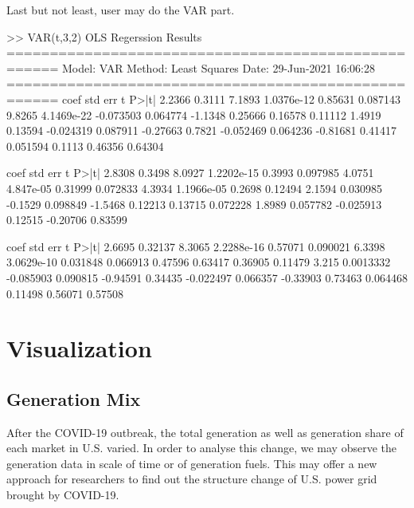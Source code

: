 \documentclass[10pt]{article}
\numberwithin{equation}{section}
\numberwithin{table}{section}
\numberwithin{figure}{section}
\begin{document}
Last but not least, user may do the VAR part. 
\begin{Command}
>> VAR(t,3,2)
               OLS Regerssion Results 
====================================================
           Model:                      VAR
           Method:           Least Squares
           Date:      29-Jun-2021 16:06:28
====================================================
        coef        std err         t         P>|t|     
       2.2366       0.3111       7.1893   1.0376e-12
      0.85631     0.087143       9.8265   4.1469e-22
    -0.073503     0.064774      -1.1348      0.25666
      0.16578      0.11112       1.4919      0.13594
    -0.024319     0.087911     -0.27663       0.7821
    -0.052469     0.064236     -0.81681      0.41417
     0.051594       0.1113      0.46356      0.64304

        coef        std err         t         P>|t|     
       2.8308       0.3498       8.0927   1.2202e-15
       0.3993     0.097985       4.0751    4.847e-05
      0.31999     0.072833       4.3934   1.1966e-05
       0.2698      0.12494       2.1594     0.030985
      -0.1529     0.098849      -1.5468      0.12213
      0.13715     0.072228       1.8989     0.057782
    -0.025913      0.12515     -0.20706      0.83599


        coef        std err         t         P>|t|     
       2.6695      0.32137       8.3065   2.2288e-16
      0.57071     0.090021       6.3398   3.0629e-10
     0.031848     0.066913      0.47596      0.63417
      0.36905      0.11479        3.215    0.0013332
    -0.085903     0.090815     -0.94591      0.34435
    -0.022497     0.066357     -0.33903      0.73463
     0.064468      0.11498      0.56071      0.57508
\end{Command}


\newpage
\section{Visualization} \label{sec:visual}

\subsection{Generation Mix}

After the COVID-19 outbreak, the total generation as well as generation share of each market in U.S. varied. In order to analyse this change, we may observe the generation data in scale of time or of generation fuels. This may offer a new approach for researchers to find out the structure change of U.S. power grid brought by COVID-19.
\end{document}
